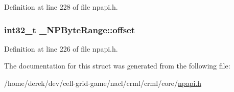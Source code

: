 Definition at line 228 of file npapi.h.

\hypertarget{struct___n_p_byte_range_aeedbe57bcd478d8a710389e38d8b5ed4}{
\subsubsection[{offset}]{\setlength{\rightskip}{0pt plus 5cm}int32\_\-t {\bf \_\-NPByteRange::offset}}}
\label{struct___n_p_byte_range_aeedbe57bcd478d8a710389e38d8b5ed4}


Definition at line 226 of file npapi.h.



The documentation for this struct was generated from the following file:\begin{DoxyCompactItemize}
\item 
/home/derek/dev/cell-\/grid-\/game/nacl/crml/crml/core/\hyperlink{npapi_8h}{npapi.h}\end{DoxyCompactItemize}
